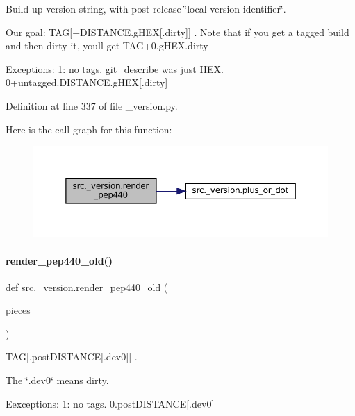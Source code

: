 Build up version string, with post-\/release \char`\"{}local version identifier\char`\"{}. 

Our goal\+: T\+AG\mbox{[}+\+D\+I\+S\+T\+A\+N\+CE.g\+H\+EX\mbox{[}.dirty\mbox{]}\mbox{]} . Note that if you get a tagged build and then dirty it, you\textquotesingle{}ll get T\+A\+G+0.g\+H\+E\+X.\+dirty

Exceptions\+: 1\+: no tags. git\+\_\+describe was just H\+EX. 0+untagged.D\+I\+S\+T\+A\+N\+C\+E.\+g\+H\+EX\mbox{[}.dirty\mbox{]} 

Definition at line 337 of file \+\_\+version.\+py.

Here is the call graph for this function\+:
\nopagebreak
\begin{figure}[H]
\begin{center}
\leavevmode
\includegraphics[width=350pt]{namespacesrc_1_1__version_a08b184a852fca45124c31efad07ae91d_cgraph}
\end{center}
\end{figure}
\mbox{\label{namespacesrc_1_1__version_a04e18593f1d130a8f2609ebb4520faf3}} 
\paragraph{\texorpdfstring{render\+\_\+pep440\+\_\+old()}{render\_pep440\_old()}}
{\footnotesize\ttfamily def src.\+\_\+version.\+render\+\_\+pep440\+\_\+old (\begin{DoxyParamCaption}\item[{}]{pieces }\end{DoxyParamCaption})}



T\+AG\mbox{[}.post\+D\+I\+S\+T\+A\+N\+CE\mbox{[}.dev0\mbox{]}\mbox{]} . 

The \char`\"{}.\+dev0\char`\"{} means dirty.

Eexceptions\+: 1\+: no tags. 0.\+post\+D\+I\+S\+T\+A\+N\+CE\mbox{[}.dev0\mbox{]} 

